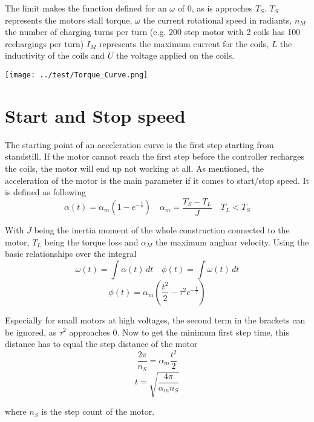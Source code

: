 \documentclass{article}
\begin{document}
    The limit makes the function defined for an $\omega$ of 0, as is approches $T_S$. $T_S$ represents the motors stall torque, 
    $\omega$ the current rotational speed in radiants, $n_M$ the number of charging turns per turn (e.g. 200 step motor with 2 coils has 100 rechargings per turn)
    $I_M$ represents the maximum current for the coils, $L$ the inductivity of the coils and $U$ the voltage applied on the coils.

    \begin{center}
        \texttt{[image: ../test/Torque\_Curve.png]}
    \end{center}
    
\section{Start and Stop speed}

    The starting point of an acceleration curve is the first step starting from standstill. If the motor cannot reach the first step before the controller recharges the coils, 
    the motor will end up not working at all. As mentioned, the acceleration of the motor is the main parameter if it comes to start/stop speed. It is defined as following
    \begin{equation}
        \alpha(t) = \alpha_m (1 - e^{-\frac{t}{\tau}}) \quad \alpha_m = \frac{T_S - T_L}{J} \quad T_L < T_S
    \end{equation}

    With $J$ being the inertia moment of the whole construction connected to the motor, $T_L$ being the torque loss and $\alpha_M$ the maximum angluar velocity.
    Using the basic relationships over the integral
    \[
        \omega(t) = \int \alpha(t) \, dt \quad \phi(t) = \int \omega(t) \, dt
    \]
    \begin{equation}
        \phi(t) = \alpha_m (\frac{t^2}{2} - \tau^2 e^{-\frac{t}{\tau}})
    \end{equation}

    Especially for small motors at high voltages, the second term in the brackets can be ignored, as $\tau^2$ approaches 0. Now to get the minimum first step time, this distance has to equal the step distance of the motor
    \[
        \frac{2\pi}{n_S} = \alpha_m \frac{t^2}{2}
    \]
    \begin{equation}
        t = \sqrt{\frac{4\pi}{\alpha_m n_S}}
    \end{equation}

    where $n_S$ is the step count of the motor.
\end{document}
